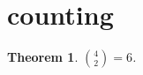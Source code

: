 \documentclass{article}
\newtheorem{theorem}{Theorem}
\begin{document}
\section{counting}

\begin{theorem}\label{thm:RC02}
$\binom{4}{2}=6$.
\end{theorem}
\end{document}
